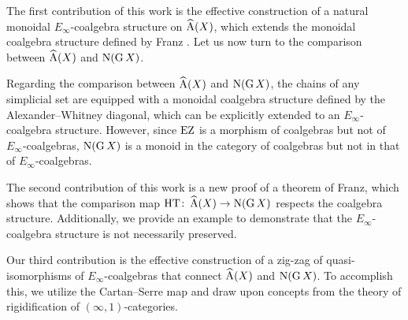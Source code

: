 The first contribution of this work is the effective construction of a natural monoidal $E_\infty$-coalgebra structure on $\operatorname{\widehat{A}}(X)$, which extends the monoidal coalgebra structure defined by Franz \cite{franz2020szczarba}.
Let us now turn to the comparison between $\operatorname{\widehat{A}}(X)$ and $\operatorname{N}(\operatorname{G} X)$.

Regarding the comparison between $\operatorname{\widehat{A}}(X)$ and $\operatorname{N}(\operatorname{G} X)$, the chains of any simplicial set are equipped with a monoidal coalgebra structure defined by the Alexander--Whitney diagonal, which can be explicitly extended to an $E_\infty$-coalgebra structure. However, since $\operatorname{EZ}$ is a morphism of coalgebras but not of $E_\infty$-coalgebras, $\operatorname{N}(\operatorname{G} X)$ is a monoid in the category of coalgebras but not in that of $E_\infty$-coalgebras.

The second contribution of this work is a new proof of a theorem of Franz, which shows that the comparison map $\operatorname{HT} \colon \operatorname{\widehat{A}}(X) \to \operatorname{N}(\operatorname{G} X)$ respects the coalgebra structure. Additionally, we provide an example to demonstrate that the $E_\infty$-coalgebra structure is not necessarily preserved.

Our third contribution is the effective construction of a zig-zag of quasi-isomorphisms of $E_\infty$-coalgebras that connect $\operatorname{\widehat{A}}(X)$ and $\operatorname{N}(\operatorname{G} X)$.
To accomplish this, we utilize the Cartan--Serre map and draw upon concepts from the theory of rigidification of $(\infty,1)$-categories.